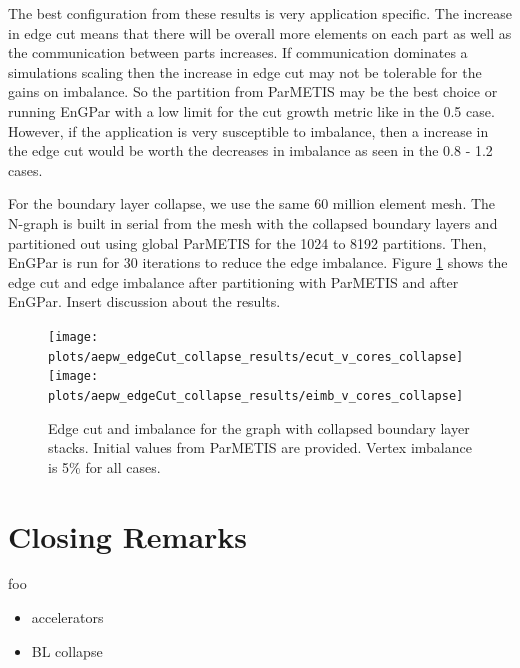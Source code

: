 \documentclass[conference]{IEEEtran}
\begin{document}
The best configuration from these results is very application specific. The increase in
edge cut means that there will be overall more elements on each part as well as the communication
between parts increases. If communication dominates a simulations scaling then the increase in
edge cut may not be tolerable for the gains on imbalance. So the partition from ParMETIS may
be the best choice or running EnGPar with a low limit for the cut growth metric like in the
0.5 case. However, if the application is very susceptible to imbalance, then a increase in the
edge cut would be worth the decreases in imbalance as seen in the 0.8 - 1.2 cases.

For the boundary layer collapse, we use the same 60 million element mesh. The N-graph is
built in serial from the mesh with the collapsed boundary layers and partitioned
out using global ParMETIS for the 1024 to 8192 partitions.
Then, EnGPar is run for 30 iterations to reduce the edge imbalance. Figure \ref{fig:collapse}
shows the edge cut and edge imbalance after partitioning with
ParMETIS and after EnGPar. {\color{red} Insert discussion about the results.}


\begin{figure}[!ht]
  \centering
  \texttt{[image: plots/aepw\_edgeCut\_collapse\_results/ecut\_v\_cores\_collapse]}
  \texttt{[image: plots/aepw\_edgeCut\_collapse\_results/eimb\_v\_cores\_collapse]}
  \caption{Edge cut and imbalance for the graph with collapsed boundary layer stacks. Initial values from ParMETIS are provided. Vertex imbalance is 5\% for all cases.}
  \label{fig:collapse}
\end{figure}

\section{Closing Remarks}
foo

\begin{itemize}
\item accelerators
\item BL collapse
\end{itemize}



\end{document}
